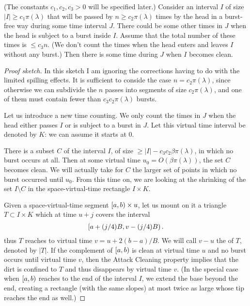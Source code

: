 \documentclass[12pt]{memoir}
\renewcommand{\le}{\leq}
\renewcommand{\ge}{\geq}
\def\B{B}
\begin{document}
\begin{lemma}\label{lem:dirty-passes}
(The constants \( c_{1},c_{2},c_{3}>0 \) will be specified later.)
Consider an interval \( I \) of size \( |I|\ge c_{1}\pi(\lambda) \) 
that will be passed by \( n\ge c_{2}\pi(\lambda) \) times
by the head in a burst-free way during some time interval \( J \).
There could be some other times in \( J \) when the head is subject to a burst inside \( I \).
Assume that the total number of these times is \( \le c_{3} n \).
(We don't count the times when the head enters and leaves \( I \) without
any burst.)
Then there is some time during \( J \) when \( I \) becomes clean.
\end{lemma}
\begin{proof}[Proof sketch]
In this sketch I am ignoring the corrections having to do with the
limited spilling effects.
It is sufficient to conside the case \( n=c_{2}\pi(\lambda) \), since otherwise
we can subdivide the \( n \) passes into segments of size \( c_{2}\pi(\lambda) \),
and one of them must contain fewer than \( c_{3}c_{2}\pi(\lambda) \) bursts.

Let us introduce a new  time counting.
We only count the times in \( J \) when the head either passes \( I \)
or is subject to a burst in \( J \).
Let this virtual time interval be denoted by \( K \): we can assume it starts at 0.

There is a subset \( C \) of the interval \( I \),
of size \( \ge |I|-c_{3}c_{2}\beta\pi(\lambda) \), in which no burst occurs at all.
Then at some virtual time \( u_{0}=O(\beta\pi(\lambda)) \), the set \( C \) becomes clean.
We will actually take for \( C \) the larger set of points in which no burst occurred until
\( u_{0} \).
From this time on, we are looking at the shrinking of the set \( I\setminus C \)
in the space-virtual-time rectangle \( I\times K \).

Given a space-virtual-time segment \( \left[a,b\right)\times u \),
let us mount on it a triangle \( T\subset I\times K \)
which at time \( u+j \) covers the interval
 \begin{align*}
 \lint{a+(j/4)\B}{v-(j/4)\B}.
 \end{align*}
thus \( T \) reaches to virtual time \( v=u+2(b-a)/\B \).
We will call \( v-u \) the  of \( T \), denoted by \( |T| \).
If the complement of \( \left[a,b\right) \) is clean at virtual time \( u \)
and no burst occurs until virtual time 
\( v \), then the Attack Cleaning property implies that the dirt
is confined to \( T \) and thus disappears by virtual time \( v \).
(In the special case when \( \left[a,b\right) \) reaches to the end of the interval \( I \),
we extend the base beyond the end, creating a rectangle (with the same slopes)
at most twice as large whose tip reaches the end as well.)


\end{proof}
\end{document}
